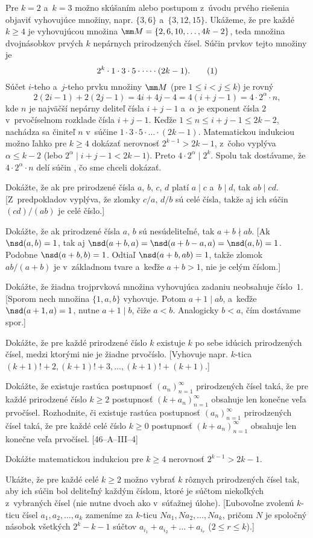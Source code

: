 {\ineriesenie
Pre $k=2$ a~$k=3$ možno skúšaním alebo postupom z~úvodu prvého riešenia objaviť vyhovujúce množiny, napr. $\{3,6\}$ a~$\{3,12,15\}$. Ukážeme, že pre každé $k\ge4$ je vyhovujúcou množina $\mm M=\{2,6,10,\dots,4k-2\}$, teda množina dvojnásobkov prvých $k$ nepárnych prirodzených čísel. Súčin prvkov tejto množiny je
$$
2^k\cdot1\cdot3\cdot5\cdot\dots\cdot(2k-1).
\tag1
$$
Súčet $i$-teho a~$j$-teho prvku množiny $\mm M$ (pre $1\le i<j\le k$) je rovný
$$
2(2i-1)+2(2j-1)=4i+4j-4=4(i+j-1)=4\cdot2^\alpha\cdot n,
$$
kde $n$ je najväčší nepárny deliteľ čísla $i+j-1$ a~$\alpha$ je exponent čísla $2$ v~prvočíselnom rozklade čísla $i+j-1$. Keďže $1\le n\le i+j-1\le 2k-2$, nachádza sa činiteľ $n$ v~súčine $1\cdot3\cdot5\cdot\dots\cdot(2k-1)$. Matematickou indukciou možno ľahko pre $k\ge4$ dokázať nerovnosť $2^{k-1}>2k-1$, z~čoho vyplýva $\alpha\le k-2$ (lebo $2^\alpha\mid i+j-1<2k-1$). Preto $4\cdot2^\alpha\mid 2^k$. Spolu tak dostávame, že $4\cdot2^\alpha\cdot n$ delí súčin , čo sme chceli dokázať.

Dokážte, že ak pre prirodzené čísla $a$, $b$, $c$, $d$ platí $a\mid c$ a~$b\mid d$, tak $ab\mid cd$.
[Z~predpokladov vyplýva, že zlomky $c/a$, $d/b$ sú celé čísla, takže aj ich súčin $(cd)/(ab)$ je celé číslo.]

Dokážte, že ak prirodzené čísla $a$, $b$ sú nesúdeliteľné, tak $a+b\nmid ab$.
[Ak $\nsd(a,b)=1$, tak aj $\nsd(a+b,a)=\nsd(a+b-a,a)=\nsd(a,b)=1$. Podobne $\nsd(a+b,b)=1$. Odtiaľ $\nsd(a+b,ab)=1$, takže zlomok $ab/(a+b)$ je v~základnom tvare a~keďže $a+b>1$, nie je celým číslom.]

Dokážte, že žiadna trojprvková množina vyhovujúca zadaniu neobsahuje číslo~$1$.
[Sporom nech množina $\{1,a,b\}$ vyhovuje. Potom $a+1\mid ab$, a~keďže $\nsd(a+1,a)=1$, nutne $a+1\mid b$, čiže $a<b$. Analogicky $b<a$, čím dostávame spor.]

Dokážte, že pre každé prirodzené číslo $k$ existuje $k$ po sebe idúcich prirodzených čísel, medzi ktorými nie je žiadne prvočíslo.
[Vyhovuje napr. $k$-tica $(k+1)!+2,(k+1)!+3,\dots,(k+1)!+(k+1)$.]

\D
Dokážte, že existuje rastúca postupnosť $(a_n)_{n=1}^{\infty}$
prirodzených čísel taká, že pre každé prirodzené číslo $k\ge2$
postupnosť $(k+a_n)_{n=1}^{\infty}$ obsahuje len konečne veľa
prvočísel. Rozhodnite, či existuje rastúca postupnosť $(a_n)_{n=1}^{\infty}$
prirodzených čísel taká, že pre každé celé číslo $k\ge0$
postupnosť $(k+a_n)_{n=1}^{\infty}$ obsahuje len konečne veľa
prvočísel. [46--A--III--4]

Dokážte matematickou indukciou pre $k\ge4$ nerovnosť $2^{k-1}>2k-1$.

Ukážte, že pre každé celé $k\ge2$ možno vybrať $k$ rôznych
prirodzených čísel tak, aby ich súčin bol deliteľný
každým číslom, ktoré je súčtom niekoľkých
z~vybraných čísel (nie nutne dvoch ako v~súťažnej úlohe).
[Ľubovoľne zvolenú $k$-ticu čísel $a_1,a_2,\dots,a_k$
zameníme za $k$-ticu $Na_1,Na_2,\dots,Na_k$, pričom $N$ je spoločný
násobok všetkých $2^k-k-1$ súčtov $a_{i_1}+a_{i_2}+\dots+a_{i_r}$
($2\le r\le k$).]

}

